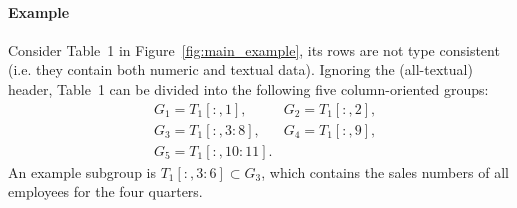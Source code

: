 \documentclass{sig-alternate-05-2015}
\newcommand{\range}[3]{\ensuremath{#1[#2,#3]}}
\newcommand{\rangeto}[2]{#1{:}#2}
\newcommand{\rangeall}{:}
\begin{document}


\paragraph{Example}
Consider Table~1 in Figure~\ref{fig:main_example}, its rows are not type consistent (i.e. they contain both numeric and textual data).
Ignoring the (all-textual) header, Table~1 can be divided into the following five column-oriented groups:
{\small
\begin{align*}
&G_1 = \range{T_1}{\rangeall}{1},
&G_2 = \range{T_1}{\rangeall}{2},\\
&G_3 = \range{T_1}{\rangeall}{\rangeto{3}{8}},
&G_4 = \range{T_1}{\rangeall}{9},\\
&G_5 = \range{T_1}{\rangeall}{\rangeto{10}{11}}.
\end{align*}
}
An example subgroup is $\range{T_1}{\rangeall}{\rangeto{3}{6}} \subset G_3$, which contains the sales numbers of all employees for the four quarters.
\end{document}
